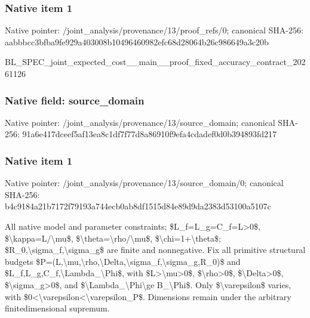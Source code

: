 \documentclass[10pt,a4paper]{article}
\begin{document}
\subsubsection{Native item 1}


Native pointer: /joint\_analysis/provenan\allowbreak{}ce/13/proof\_refs/0; canonical SHA-256: aabbbcc3bfba9fe929a40300\allowbreak{}8b10496460982efc68d28064\allowbreak{}b26c986649a3c20b


BL\_SPEC\_joint\_expected\_c\allowbreak{}ost\_\_main\_\_proof\_fixed\_a\allowbreak{}ccuracy\_contract\_2026112\allowbreak{}6


\subsubsection{Native field: source\_domain}


Native pointer: /joint\_analysis/provenan\allowbreak{}ce/13/source\_domain; canonical SHA-256: 91a6e417dceef5af13ea8c1d\allowbreak{}f7f77d8a86910f9efa4cdade\allowbreak{}f0d0b394893fd217



\subsubsection{Native item 1}


Native pointer: /joint\_analysis/provenan\allowbreak{}ce/13/source\_domain/0; canonical SHA-256: b4c9184a21b7172f79193a74\allowbreak{}4ecb0ab8df1515d84e89d9da\allowbreak{}2383d53100a5107c


All native model and parameter constraints; \$L\_f=L\_g=C\_f=L>0\$, \$\textbackslash{}kappa=L/\textbackslash{}mu\$, \$\textbackslash{}theta=\textbackslash{}rho/\textbackslash{}mu\$, \$\textbackslash{}chi=1+\textbackslash{}theta\$; \$R\_0,\textbackslash{}sigma\_f,\textbackslash{}sigma\_g\$ are finite and nonnegative. Fix all primitive structural budgets \$P=(L,\textbackslash{}mu,\textbackslash{}rho,\textbackslash{}Delta,\textbackslash{}s\allowbreak{}igma\_f,\textbackslash{}sigma\_g,R\_0)\$ and \$L\_f,L\_g,C\_f,\textbackslash{}Lambda\_\textbackslash{}Phi\$, with \$L>\textbackslash{}mu>0\$, \$\textbackslash{}rho>0\$, \$\textbackslash{}Delta>0\$, \$\textbackslash{}sigma\_g>0\$, and \$\textbackslash{}Lambda\_\textbackslash{}Phi\textbackslash{}ge B\_\textbackslash{}Phi\$. Only \$\textbackslash{}varepsilon\$ varies, with \$0<\textbackslash{}varepsilon<\textbackslash{}varepsilon\_P\$. Dimensions remain under the arbitrary finitedimensional supremum.
\end{document}
